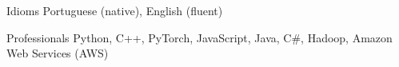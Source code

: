 
\begin{cvskills}
	\cvskill
	{Idioms}
	{Portuguese (native), English (fluent)}

	\cvskill
	{Professionals}
	{Python, C++, PyTorch, JavaScript, Java, C\#, Hadoop, Amazon Web Services (AWS)}

\end{cvskills}
